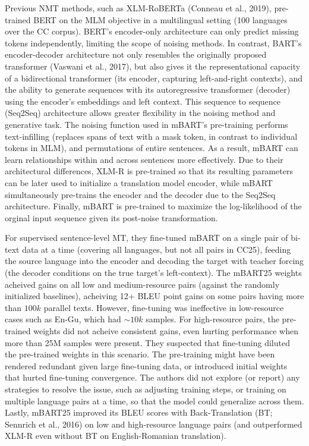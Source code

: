 \documentclass[11pt]{article}
\begin{document}
Previous NMT methods, such as XLM-RoBERTa (Conneau et al., 2019), pre-trained BERT on 
the MLM objective in a multilingual setting (100 languages over the CC corpus). BERT's encoder-only architecture can only predict missing tokens independently, 
limiting the scope of noising methods.
In contrast, BART's encoder-decoder architecture not only resembles the originally proposed transformer (Vaswani et al., 2017), 
but also gives it the representational capacity of a bidirectional transformer (its encoder, capturing left-and-right contexts),
and the ability to generate sequences with its autoregressive transformer (decoder) using the encoder's embeddings and left context. 
This sequence to sequence (Seq2Seq) architecture allows greater flexibility in the noising method and generative task. 
The noising function used in mBART's pre-training performs text-infilling (replaces spans of text with a mask token, in contrast to individual tokens in MLM), 
and permutations of entire sentences. As a result, mBART can learn relationships within and across sentences more effectively. 
Due to their architectural differences, XLM-R is pre-trained
so that its resulting parameters can be later used to initialize a translation model encoder, while
mBART simultaneously pre-trains the encoder and the decoder due to the Seq2Seq architecture. 
Finally, mBART is pre-trained to maximize the log-likelihood 
of the orginal input sequence given its post-noise transformation.

For supervised sentence-level MT, 
they fine-tuned mBART on a single pair of bi-text data at a time (covering all languages, but not all pairs in CC25), feeding the
source language into the encoder and decoding the target with teacher forcing (the decoder conditions on the true target's left-context).
The mBART25 weights acheived gains on all low and medium-resource pairs (against the randomly initialized baselines), 
acheiving 12+ BLEU point gains on some pairs 
having more than $100k$ parallel texts. However, fine-tuning was ineffective in low-resource cases such as En-Gu, which had $\sim$$10k$ samples.
For high-resource pairs, the pre-trained weights did not acheive consistent gains, 
even hurting performance when more than 25M samples were present. They
suspected that fine-tuning diluted the pre-trained weights in this scenario. 
The pre-training might have been rendered redundant given large fine-tuning data,
or introduced initial weights that hurted fine-tuning convergence. The authors did not explore (or report)
any strategies to resolve the issue, such as adjusting training steps, or 
training on multiple language pairs at a time, so that the model could generalize across them.
Lastly, mBART25 improved its
BLEU scores with Back-Translation (BT;
Sennrich et al., 2016) on low and high-resource language pairs (and outperformed XLM-R even without BT on English-Romanian translation).
\end{document}
